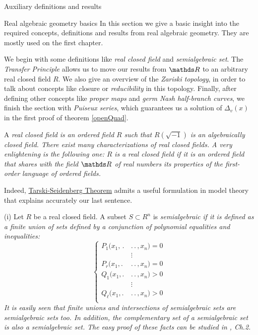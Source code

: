 \documentclass[11pt, a4paper, english, twoside, notitlepage, openright]{report}
\begin{document}
\appendix
\begin{chapter}{Auxiliary definitions and results}

\begin{section}{Real algebraic geometry basics}
In this section we give a basic insight into the required concepts, definitions and results from real algebraic geometry. They are mostly used on the first chapter.

We begin with some definitions like \emph{real closed field} and \emph{semialgebraic set}. The \emph{Transfer Principle} allows us to move our results from $\R$ to an arbitrary real closed field $R$. We also give an overview of the \emph{Zariski topology}, in order to talk about concepts like closure or \emph{reducibility} in this topology. Finally, after defining other concepts like \emph{proper maps} and \emph{germ Nash half-branch curves}, we finish the section with \emph{Puiseux series}, which guarantees us a solution of $\Delta_v(x)$ in the first proof of theorem \ref{openQuad}.
\begin{definition}\label{realCField}
	A \em real closed field \em is an ordered field $R$ such that $R(\sqrt{-1})$ is an algebraically closed field. There exist many characterizations of real closed fields. A very enlightening is the following one: $R$ is a real closed field if it is an ordered field that shares with the field $\R$ of real numbers its properties of the first-order language of ordered fields. 
\end{definition}

Indeed, \hyperref[tarskiSeidenberg]{Tarski-Seidenberg Theorem} admits a useful formulation in model theory that explains accurately our last sentence.

\begin{definitions}\label{semialgSet} (i) Let $R$ be a real closed field. A subset $S\subset R^n$ is \em semialgebraic \em if it is defined as a finite union of sets defined by a conjunction of polynomial equalities and inequalities: 
	\begin{equation*}
	\left\{
	\begin{aligned}
		P_1(x_1,\, .\,&.\,.\, , x_n) = 0\\
		&\vdots\\
		P_r(x_1, .\,&.\,.\, , x_n) = 0 \\
		Q_1(x_1, .\,&.\,.\, , x_n) > 0 \\
		&\vdots\\
		Q_{\ell}(x_1, .\,&.\,.\, , x_n) > 0 \\
	\end{aligned}
	\right.
	\end{equation*}
It is easily seen that finite unions and intersections of semialgebraic sets are semialgebraic sets too. In addition, the complementary set of a semialgebraic set is also a semialgebraic set. The easy proof of these facts can be studied in \cite{bcr}, Ch.2.
	

\end{definitions}
\end{section}
\end{chapter}
\end{document}
